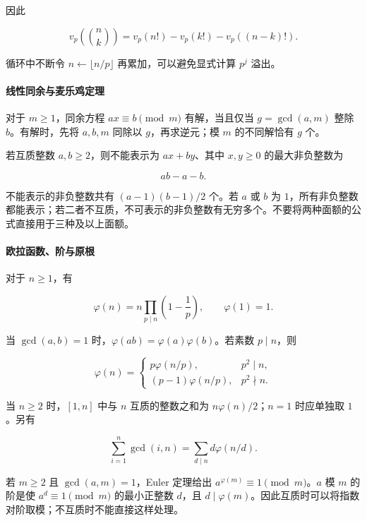 因此

\[
v_p\!\left(\binom{n}{k}\right)
=v_p(n!)-v_p(k!)-v_p((n-k)!).
\]

循环中不断令 \(n\gets\lfloor n/p\rfloor\) 再累加，可以避免显式计算 \(p^j\) 溢出。

\hypertarget{ux7ebfux6027ux540cux4f59ux4e0eux9ea6ux4e50ux9e21ux5b9aux7406}{%
\paragraph{线性同余与麦乐鸡定理}\label{ux7ebfux6027ux540cux4f59ux4e0eux9ea6ux4e50ux9e21ux5b9aux7406}}

对于 \(m\ge1\)，同余方程 \(ax\equiv b\pmod m\) 有解，当且仅当 \(g=\gcd(a,m)\) 整除 \(b\)。有解时，先将 \(a,b,m\) 同除以 \(g\)，再求逆元；模 \(m\) 的不同解恰有 \(g\) 个。

若互质整数 \(a,b\ge2\)，则不能表示为 \(ax+by\)、其中 \(x,y\ge0\) 的最大非负整数为

\[
ab-a-b.
\]

不能表示的非负整数共有 \((a-1)(b-1)/2\) 个。若 \(a\) 或 \(b\) 为 \(1\)，所有非负整数都能表示；若二者不互质，不可表示的非负整数有无穷多个。不要将两种面额的公式直接用于三种及以上面额。

\hypertarget{ux6b27ux62c9ux51fdux6570ux9636ux4e0eux539fux6839}{%
\paragraph{欧拉函数、阶与原根}\label{ux6b27ux62c9ux51fdux6570ux9636ux4e0eux539fux6839}}

对于 \(n\ge1\)，有

\[
\varphi(n)=n\prod_{p\mid n}\left(1-\frac1p\right),\qquad
\varphi(1)=1.
\]

当 \(\gcd(a,b)=1\) 时，\(\varphi(ab)=\varphi(a)\varphi(b)\)。若素数 \(p\mid n\)，则

\[
\varphi(n)=
\begin{cases}
 p\varphi(n/p), & p^2\mid n,\\
 (p-1)\varphi(n/p), & p^2\nmid n.
\end{cases}
\]

当 \(n\ge2\) 时，\([1,n]\) 中与 \(n\) 互质的整数之和为 \(n\varphi(n)/2\)；\(n=1\) 时应单独取 \(1\)。另有

\[
\sum_{i=1}^{n}\gcd(i,n)=\sum_{d\mid n}d\varphi(n/d).
\]

若 \(m\ge2\) 且 \(\gcd(a,m)=1\)，Euler 定理给出 \(a^{\varphi(m)}\equiv1\pmod m\)。\(a\) 模 \(m\) 的阶是使 \(a^d\equiv1\pmod m\) 的最小正整数 \(d\)，且 \(d\mid\varphi(m)\)。因此互质时可以将指数对阶取模；不互质时不能直接这样处理。

